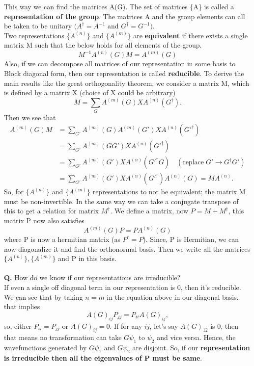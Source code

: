 \documentclass{article}
\begin{document}
	This way we can find the matrices A(G). The set of matrices \{A\} is called a \textbf{representation of the group}. The matrices A and the group elements can all be taken to be unitary $(A^\dagger = A^{-1}$ and $G^\dagger = G^{-1})$. \\
	Two representations $\{A^{(n)}\}$ and $\{A^{(m)}\}$ are \textbf{equivalent} if there exists a single matrix M such that the below holds for all elements of the group.
	\begin{equation}
		M^{-1} A^{(n)} (G) M =  A^{(m)}(G)
	\end{equation} 
	Also, if we can decompose all matrices of our representation in some basis to Block diagonal form, then our representation is called \textbf{reducible}. To derive the main results like the great orthogonality theorem, we consider a matrix M, which is defined by a matrix X (choice of X could be arbitrary)
	\begin{equation}
		M = \sum_G  A^{(m)}(G) X  A^{(n)}(G^\dagger).
	\end{equation}
	Then we see that
	\begin{equation}
		\begin{split}
			 A^{(m)}(G) M &= \sum_{G'} A^{(m)}(G) A^{(m)}(G') X  A^{(n)}(G'^\dagger)\\
			 &= \sum_{G'} A^{(m)}(GG') X  A^{(n)}(G'^\dagger)\\
			 &= \sum_{G'} A^{(m)}(G') X  A^{(n)}(G'^\dagger G) \quad (\mathrm{replace} \; G' \to G^\dagger G')\\
			  &= \sum_{G'} A^{(m)}(G') X  A^{(n)}(G'^\dagger)A^{(n)}( G) = MA^{(n)}.
		\end{split}
	\end{equation}
	So, for $\{A^{(n)}\}$ and $\{A^{(m)}\}$ representations to not be equivalent; the matrix M must be non-invertible. In the same way we can take a conjugate transpose of this to get a relation for matrix $M^\dagger$. We define a matrix, now $P = M + M^\dagger$, this matrix P now also satisfies
	\begin{equation}
		A^{(m)}(G) P = P A^{(n)}(G) 
	\end{equation}
	where P is now a hermitian matrix (as $P^\dagger = P$). Since, P is Hermitian, we can now diagonalize it and find the orthonormal basis. Then we write all the matrices $\{A^{(n)}\},\{A^{(m)}\}$ and P in this basis.\\\\
	\textbf{Q.} How do we know if our representations are irreducible?\\
	If even a single off diagonal term in our representation is 0, then it's reducible. We can see that by taking $n=m$ in the equation above in our diagonal basis, that implies
	\begin{equation}
		A(G)_{ij}P_{jj} = P_{ii} A(G)_{ij},
	\end{equation}
	so, either $P_{ii} = P_{jj}$ or $A(G)_{ij} = 0$. If for any $ij$, let's say $A(G)_{12}$ is 0, then that means no transformation can take $G\psi_1$ to $\psi_2$ and vice versa. Hence, the wavefunctions generated by $G\psi_1$ and $G\psi_2$ are disjoint. So, if our \textbf{representation is irreducible then all the eigenvalues of P must be same}.
	
\end{document}
